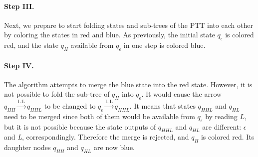 \paragraph{Step III.}

Next, we prepare to start folding states and sub-trees of the PTT into each other by coloring the states in red and blue.
As previously, the initial state $q_\epsilon$ is colored red, and the state $q_H$ available from $q_\epsilon$ in one step is colored blue.

\begin{center}
\end{center}

\paragraph{Step IV.}

The algorithm attempts to merge the blue state into the red state.
However, it is not possible to fold the sub-tree of $q_H$ into $q_\epsilon$.
It would cause the arrow $q_{HH}\xrightarrow{\text{L:L}}q_{HHL}$ to be changed to $q_{\epsilon}\xrightarrow{\text{L:L}}q_{HHL}$.
It means that states $q_{HHL}$ and $q_{HL}$ need to be merged since both of them would be available from $q_\epsilon$ by reading $L$, but it is not possible because the state outputs of $q_{HHL}$ and $q_{HL}$ are different: \emph{$\epsilon$} and \emph{L}, correspondingly.
Therefore the merge is rejected, and $q_H$ is colored red.
Its daughter nodes $q_{HH}$ and $q_{HL}$ are now blue.

